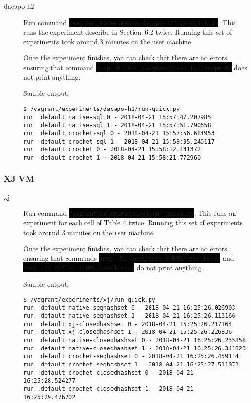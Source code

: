 \documentclass[12pt]{article}
\newcommand{\command}[1]{\colorbox{black}{\texttt{\color{white}#1}}}
\begin{document}
\begin{description}
    \item[dacapo-h2] Run command
        \command{/vagrant/experiments/dacapo-h2/run-quick.py}.  This runs the
        experiment describe in Section~6.2 twice.  Running this set of
        experiments took around 3 minutes on the user machine.

        Once the experiment finishes, you can check that there are no errors
        ensuring that command \command{grep -R FAIL /vagrant/results/dacapo-h2}
        does not print anything.

Sample output:
\begin{verbatim}
$ /vagrant/experiments/dacapo-h2/run-quick.py
run  default native-sql 0 - 2018-04-21 15:57:47.207985
run  default native-sql 1 - 2018-04-21 15:57:51.790658
run  default crochet-sql 0 - 2018-04-21 15:57:56.684953
run  default crochet-sql 1 - 2018-04-21 15:58:05.240117
run  default crochet 0 - 2018-04-21 15:58:12.131372
run  default crochet 1 - 2018-04-21 15:58:21.772960
\end{verbatim}
\end{description}

\subsubsection{XJ VM}

\begin{description}

    \item[xj] Run command \command{/vagrant/experiments/xj/run-quick.py}.  This
        runs an experiment for each cell of Table 4 twice.  Running this set of
        experiments took around 3 minutes on the user machine.

        Once the experiment finishes, you can check that there are no errors
        ensuring that commands \command{grep -Ri exception \$HOME/results/xj} and
        \command{grep -Ri differ \$HOME/results/xj} do not print anything.

Sample output:
\begin{verbatim}
$ /vagrant/experiments/xj/run-quick.py
run  default native-seqhashset 0 - 2018-04-21 16:25:26.026903
run  default native-seqhashset 1 - 2018-04-21 16:25:26.113166
run  default xj-closedhashset 0 - 2018-04-21 16:25:26.217164
run  default xj-closedhashset 1 - 2018-04-21 16:25:26.226836
run  default native-closedhashset 0 - 2018-04-21 16:25:26.235858
run  default native-closedhashset 1 - 2018-04-21 16:25:26.341823
run  default crochet-seqhashset 0 - 2018-04-21 16:25:26.459114
run  default crochet-seqhashset 1 - 2018-04-21 16:25:27.511073
run  default crochet-closedhashset 0 - 2018-04-21 16:25:28.524277
run  default crochet-closedhashset 1 - 2018-04-21 16:25:29.476202
\end{verbatim}

\end{description}
\end{document}
